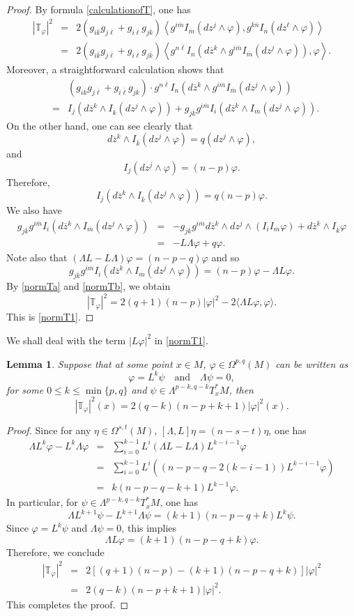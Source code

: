 \documentclass[12pt, reqno]{amsart}
\theoremstyle{plain}
\newtheorem{lemma}[thm]{Lemma}
\theoremstyle{definition}
\newcommand{\bproof}{\begin{proof}}
\newcommand{\eproof}{\end{proof}}
\newcommand{\elemma}{\end{lemma}}
\newcommand{\blemma}{\begin{lemma}}
\newcommand{\la}{\langle}
\newcommand{\ra}{\rangle}
\renewcommand{\bar}{\overline}
\renewcommand{\phi}{\varphi}
\newcommand{\beq}{\begin{equation}}
\newcommand{\eeq}{\end{equation}}
\newcommand{\ee}{\end{eqnarray*}}
\newcommand{\be}{\begin{eqnarray*}}
\newcommand{\qtq}[1]{\quad\mbox{#1}\quad}
\newcommand{\Om}{\Omega}
\renewcommand{\>}{\rightarrow}
\renewcommand{\#}{\sharp}
\numberwithin{equation}{section} %
\begin{document}
\bproof
By formula \eqref{calculationofT}, one has
\be  |\mathbb T_\phi|^2
& = & 2(g_{i\bar k}g_{j \bar \ell} + g_{i\bar \ell}g_{j \bar k}) \left \langle g^{i\bar m}I_{\bar m}(dz^j \wedge \phi), g^{k\bar n}I_{\bar n}(dz^\ell \wedge \phi) \right \rangle \\
& = & 2(g_{i\bar k}g_{j \bar \ell} + g_{i\bar \ell}g_{j \bar k}) \left \langle g^{n\bar \ell}I_{n}\left ( d\bar z{}^k \wedge g^{i\bar m}I_{\bar m}(dz^j \wedge \phi) \right) , \phi \right \rangle. \ee
Moreover, a straightforward calculation shows that
\be
&& (g_{i\bar k}g_{j \bar \ell} + g_{i\bar \ell}g_{j \bar k}) \cdot g^{n\bar \ell}I_{n}\left ( d\bar z{}^k \wedge g^{i\bar m}I_{\bar m}(dz^j \wedge \phi) \right) \\
& = & I_j(d\bar z{}^k \wedge I_{\bar k}(dz^j \wedge \phi)) + g_{j\bar k} g^{i\bar m} I_i(d\bar z{}^k \wedge I_{\bar m}(dz^j \wedge \phi)).
\ee
On the other hand, one can see clearly that
\beq d\bar z{}^k \wedge I_{\bar k}(dz^j \wedge \phi)=q\left(dz^j \wedge \phi\right), \eeq and \beq  I_j\left(dz^j \wedge \phi\right)=(n-p)\phi.  \eeq
Therefore,
\beq  I_j(d\bar z{}^k \wedge I_{\bar k}(dz^j \wedge \phi))=q(n-p)\phi. \label{normTa}\eeq
We also have
\be g_{j\bar k} g^{i\bar m} I_i(d\bar z{}^k \wedge I_{\bar m}(dz^j \wedge \phi))&=&- g_{j \bar k} g^{i \bar m}d\bar z{}^k \wedge dz^j\wedge  \left(I_i I_{\bar m} \phi\right) + d\bar z{}^k \wedge I_{\bar k} \phi\\
&=&- L\Lambda  \phi+q\phi.\ee
Note also that $\left(\Lambda L-L\Lambda\right) \phi=(n-p-q)\phi$ and so
\beq g_{j\bar k} g^{i\bar m} I_i(d\bar z{}^k \wedge I_{\bar m}(dz^j \wedge \phi))=(n-p)\phi-\Lambda L\phi.\label{normTb}\eeq  By \eqref{normTa} and \eqref{normTb}, we obtain
\beq|\mathbb T_\phi|^2 = 2(q+1)(n-p)|\phi|^2 - 2\la\Lambda L\phi,\phi\ra. \eeq
This is \eqref{normT1}.
\eproof
\noindent We shall deal with the term $|L\phi|^2$ in \eqref{normT1}.



\blemma\label{normT2} Suppose that at some point $ x \in M $, $ \phi \in \Omega^{p,q}(M) $ can be written as \beq  \phi = L^k \psi \qtq{and} \Lambda \psi = 0, \eeq for some  $ 0 \leq k \leq \min\{p,q\} $ and $ \psi \in \Lambda^{p-k,q-k}T^*_xM $, then
\beq |\mathbb T_\phi|^2(x) = 2(q - k)(n - p + k + 1) |\phi|^2(x).\eeq
\elemma

\bproof Since for any $\eta\in \Om^{s,t}(M)$, $ [\Lambda , L]\eta = (n - s - t) \eta$, one has
\be
\Lambda L^k\phi - L^k \Lambda\phi
& = & \sum_{i = 0}^{k-1} L^i (\Lambda L - L\Lambda) L^{k-i-1}\phi \\
& = & \sum_{i = 0}^{k-1} L^i\left( \left(n - p - q - 2(k - i - 1)\right) L^{k-i-1}\phi\right) \\
& = & k (n - p - q - k + 1) L^{k-1}\phi.
\ee
In particular, for $ \psi \in \Lambda^{p-k,q-k}T^*_xM $, one has
\beq \Lambda L^{k+1} \psi - L^{k+1} \Lambda \psi = (k+1)(n-p-q+k) L^k \psi. \eeq
Since $\phi=L^k\psi$ and $\Lambda\psi=0$, this implies
\beq \Lambda L \phi = (k+1)(n-p-q+k) \phi. \eeq
Therefore, we conclude
\be |\mathbb T_\phi|^2 &=&2\left[(q+1)(n-p)- (k+1)(n-p-q+k)\right]|\phi|^2\\&=& 2(q - k)(n - p + k + 1) |\phi|^2.\ee
This completes the proof.
\eproof
\end{document}
